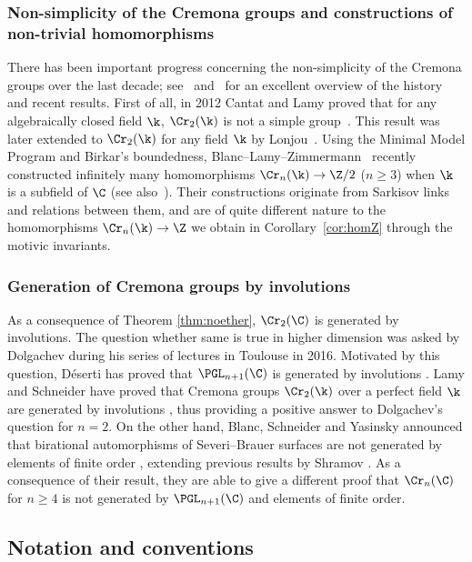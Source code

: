 \subsubsection{Non-simplicity of the Cremona groups and constructions of non-trivial homomorphisms}


There has been important progress concerning the non-simplicity of the Cremona groups
over the last decade;
see~\cite{Cantat-Cremona} and~\cite[Introduction]{BLZ}
for an excellent overview of the history and recent results.
First of all,
in 2012
Cantat and Lamy proved that
for any algebraically closed
field $\k$,
$\Cr_2(\k)$ is not a simple group~\cite{MR3037611}.
This result was later extended to $\Cr_2(\k)$ for any field $\k$ by Lonjou~\cite{MR3533276}.
Using the Minimal Model Program and Birkar's boundedness,
Blanc--Lamy--Zimmermann~\cite{BLZ} recently constructed infinitely
many homomorphisms $\Cr_n(\k) \to \Z/2$ ($n \ge 3$) when $\k$ is a subfield of $\C$ (see also~\cite{MR4136435}).
Their constructions
originate from Sarkisov links and relations between them, and
are of quite different nature to
the homomorphisms
$\Cr_n(\k) \to \Z$ we obtain
in Corollary~\ref{cor:homZ}
through the motivic invariants.

\subsubsection{Generation of Cremona groups
by involutions}


As a consequence of Theorem \ref{thm:noether},
$\Cr_2(\C)$ is generated by involutions.
The question whether same is true in higher dimension
was asked by Dolgachev during his series of lectures
in Toulouse in 2016.
Motivated by this question, D\'eserti has proved that $\PGL_{n+1}(\C)$
is generated by involutions \cite[Proposition C]{Deserti}.
Lamy and Schneider have proved
that Cremona groups $\Cr_2(\k)$ over a perfect field $\k$ are generated
by involutions \cite{LamySchneider}, thus providing
a positive answer to Dolgachev's question for $n = 2$.
On the other hand,
Blanc, Schneider and Yasinsky announced
that birational automorphisms of Severi--Brauer surfaces
are not generated by elements of finite order \cite{BSY},
extending previous results by Shramov \cite{Shramov-SB}.
As a consequence of their result,
they
are able to give a different proof that $\Cr_n(\C)$
for $n \ge 4$
is not generated by $\PGL_{n+1}(\C)$ and elements of finite order.


\subsection{Notation and conventions}
\label{ss:notation}



